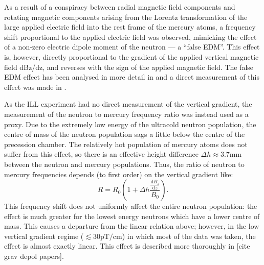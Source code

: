 As a result of a conspiracy between radial magnetic field components and rotating magnetic components arising from the Lorentz transformation of the large applied electric field into the rest frame of the mercury atoms, a frequency shift proportional to the applied electric field was observed, mimicking the effect of a non-zero electric dipole moment of the neutron --- a “false EDM”. This effect is, however, directly proportional to the gradient of the applied vertical magnetic field dBz/dz, and reverses with the sign of the applied magnetic field. The false EDM effect has been analysed in more detail in  and a direct measurement of this effect was made in .

As the ILL experiment had no direct measurement of the vertical gradient, the measurement of the neutron to mercury frequency ratio was instead used as a proxy. Due to the extremely low energy of the ultracold neutron population, the centre of mass of the neutron population sags a little below the centre of the precession chamber. The relatively hot population of mercury atoms does not suffer from this effect, so there is an effective height difference $\Delta h \approx 3.7 \mathrm{mm}$ between the neutron and mercury populations. Thus, the ratio of neutron to mercury frequencies depends (to first order) on the vertical gradient like: 
\begin{equation}
  R = R_0 \left( 1 + \Delta h  \frac{\frac{\mathrm{d}B_z}{\mathrm{d}z}}{B_{0}} \right).
  \label{eq:R}
\end{equation}
This frequency shift does not uniformly affect the entire neutron population: the effect is much greater for the lowest energy neutrons which have a lower centre of mass. This causes a departure from the linear relation above; however, in the low vertical gradient regime ($\lesssim 30 \mathrm{pT/cm}$) in which most of the data was taken, the effect is almost exactly linear. This effect is described more thoroughly in [cite grav depol papers].

